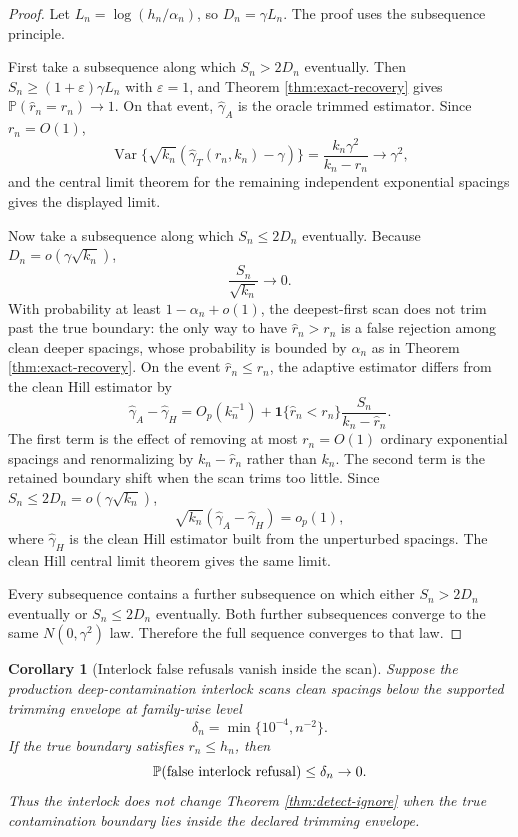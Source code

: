 \documentclass[11pt]{article}
\newtheorem{corollary}{Corollary}
\DeclareMathOperator{\Var}{Var}
\newcommand{\Pp}{\mathbb{P}}
\begin{document}
\begin{proof}
Let $L_n=\log(h_n/\alpha_n)$, so $D_n=\gamma L_n$.  The proof uses the
subsequence principle.

First take a subsequence along which $S_n>2D_n$ eventually.  Then
$S_n\ge(1+\varepsilon)\gamma L_n$ with $\varepsilon=1$, and Theorem
\ref{thm:exact-recovery} gives $\Pp(\widehat r_n=r_n)\to1$.  On that event,
$\widehat\gamma_A$ is the oracle trimmed estimator.  Since $r_n=O(1)$,
\[
  \Var\{\sqrt{k_n}(\widehat\gamma_T(r_n,k_n)-\gamma)\}
  =
  \frac{k_n\gamma^2}{k_n-r_n}
  \to
  \gamma^2,
\]
and the central limit theorem for the remaining independent exponential
spacings gives the displayed limit.

Now take a subsequence along which $S_n\le2D_n$ eventually.  Because
$D_n=o(\gamma\sqrt{k_n})$,
\[
  \frac{S_n}{\sqrt{k_n}}\to0.
\]
With probability at least $1-\alpha_n+o(1)$, the deepest-first scan does not
trim past the true boundary: the only way to have $\widehat r_n>r_n$ is a false
rejection among clean deeper spacings, whose probability is bounded by
$\alpha_n$ as in Theorem \ref{thm:exact-recovery}.  On the event
$\widehat r_n\le r_n$, the adaptive estimator differs from the clean Hill
estimator by
\[
  \widehat\gamma_A-\widehat\gamma_H
  =
  O_p(k_n^{-1})
  +
  \mathbf 1\{\widehat r_n<r_n\}
  \frac{S_n}{k_n-\widehat r_n}.
\]
The first term is the effect of removing at most $r_n=O(1)$ ordinary
exponential spacings and renormalizing by $k_n-\widehat r_n$ rather than
$k_n$.  The second term is the retained boundary shift when the scan trims too
little.  Since $S_n\le2D_n=o(\gamma\sqrt{k_n})$,
\[
  \sqrt{k_n}(\widehat\gamma_A-\widehat\gamma_H)=o_p(1),
\]
where $\widehat\gamma_H$ is the clean Hill estimator built from the unperturbed
spacings.  The clean Hill central limit theorem gives the same limit.

Every subsequence contains a further subsequence on which either
$S_n>2D_n$ eventually or $S_n\le2D_n$ eventually.  Both further subsequences
converge to the same $N(0,\gamma^2)$ law.  Therefore the full sequence
converges to that law.
\end{proof}

\begin{corollary}[Interlock false refusals vanish inside the scan]
\label{cor:interlock}
Suppose the production deep-contamination interlock scans clean spacings below
the supported trimming envelope at family-wise level
\[
  \delta_n=\min\{10^{-4},n^{-2}\}.
\]
If the true boundary satisfies $r_n\le h_n$, then
\[
  \Pp(\hbox{false interlock refusal})\le\delta_n\to0.
\]
Thus the interlock does not change Theorem \ref{thm:detect-ignore} when the
true contamination boundary lies inside the declared trimming envelope.
\end{corollary}
\end{document}
